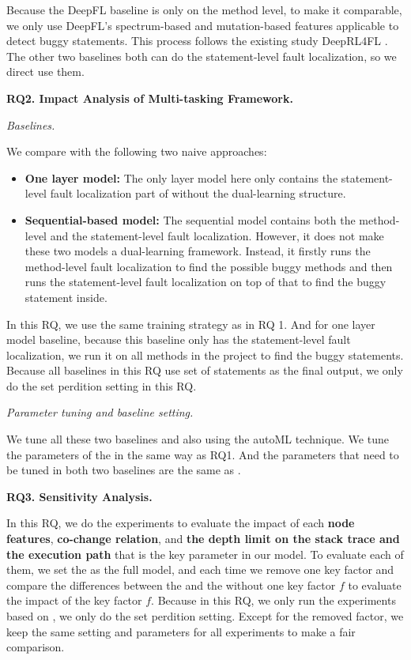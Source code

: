 Because the DeepFL baseline is only on the method level, to make it comparable, we only use DeepFL's spectrum-based and mutation-based features applicable to detect buggy statements. This process follows the existing study DeepRL4FL \cite{li2021fault}. The other two baselines both can do the statement-level fault localization, so we direct use them.

{\bf RQ2. Impact Analysis of Multi-tasking Framework.}

\textit{Baselines.}

We compare {\tool} with the following two naive approaches:

\begin{itemize}
	\item \textbf{One layer model:} The only layer model here only contains the statement-level fault localization part of \tool without the dual-learning structure. 
	
	\item \textbf{Sequential-based model:}
	The sequential model contains both the method-level and the statement-level fault localization. However, it does not make these two models a dual-learning framework. Instead, it firstly runs the method-level fault localization to find the possible buggy methods and then runs the statement-level fault localization on top of that to find the buggy statement inside.
\end{itemize}

In this RQ, we use the same training strategy as in RQ 1. And for one layer model baseline, because this baseline only has the statement-level fault localization, we run it on all methods in the project to find the buggy statements. Because all baselines in this RQ use set of statements as the final output, we only do the set perdition setting in this RQ.

{\it Parameter tuning and baseline setting.}

We tune all these two baselines and \tool also using the autoML technique. We tune the parameters of the \tool in the same way as RQ1. And the parameters that need to be tuned in both two baselines are the same as \tool. 

{\bf RQ3. Sensitivity Analysis.}

In this RQ, we do the experiments to evaluate the impact of each {\bf node features}, {\bf co-change relation}, and {\bf the depth limit on the stack trace and the execution path} that is the key parameter in our model. To evaluate each of them, we set the \tool as the full model, and each time we remove one key factor and compare the differences between the \tool and the \tool without one key factor $f$ to evaluate the impact of the key factor $f$. Because in this RQ, we only run the experiments based on \tool, we only do the set perdition setting. Except for the removed factor, we keep the same setting and parameters for all experiments to make a fair comparison.

